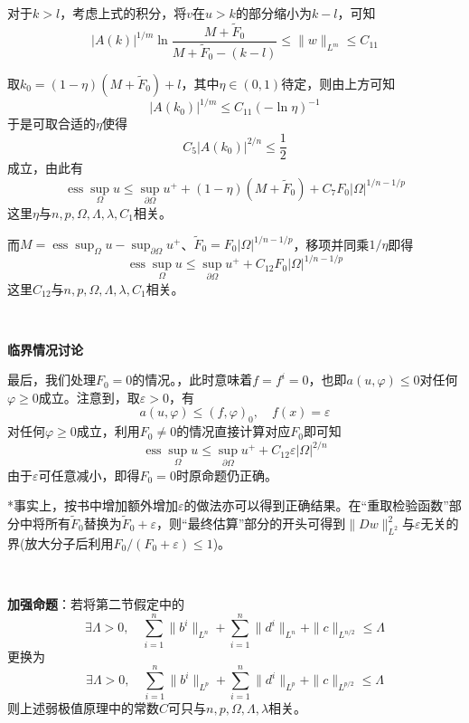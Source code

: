 \documentclass[a4paper,UTF8,fontset=windows,AutoFakeBold]{ctexart}
\DeclareMathOperator*{\ess}{ess}
\begin{document}
{    对于$k>l$，考虑上式的积分，将$v$在$u>k$的部分缩小为$k-l$，可知
    $$|A(k)|^{1/m}\ln\frac{M+\tilde{F}_0}{M+\tilde{F}_0-(k-l)}\le\|w\|_{L^m}\le C_{11}$$

    取$k_0=(1-\eta)(M+\tilde{F}_0)+l$，其中$\eta\in(0,1)$待定，则由上方可知
    $$|A(k_0)|^{1/m}\le C_{11}(-\ln\eta)^{-1}$$
    于是可取合适的$\eta$使得
    $$C_5|A(k_0)|^{2/n}\le\frac{1}{2}$$
    成立，由此有
    $$\ess\sup_\Omega u\le\sup_{\partial\Omega}u^++(1-\eta)(M+\tilde{F}_0)+C_7F_0|\Omega|^{1/n-1/p}$$
    这里$\eta$与$n,p,\Omega,\Lambda,\lambda,C_1$相关。

    而$M=\ess\sup_\Omega u-\sup_{\partial\Omega}u^+$、$\tilde{F}_0=F_0|\Omega|^{1/n-1/p}$，移项并同乘$1/\eta$即得
    $$\ess\sup_\Omega u\le\sup_{\partial\Omega}u^++C_{12}F_0|\Omega|^{1/n-1/p}$$
    这里$C_{12}$与$n,p,\Omega,\Lambda,\lambda,C_1$相关。

    \

    \textbf{临界情况讨论}

    最后，我们处理$F_0=0$的情况。，此时意味着$f=f^i=0$，也即$a(u,\varphi)\le0$对任何$\varphi\ge0$成立。注意到，取$\varepsilon>0$，有
    $$a(u,\varphi)\le(f,\varphi)_0,\quad f(x)=\varepsilon$$
    对任何$\varphi\ge0$成立，利用$F_0\ne0$的情况直接计算对应$F_0$即可知
    $$\ess\sup_\Omega u\le\sup_{\partial\Omega}u^++C_{12}\varepsilon|\Omega|^{2/n}$$
    由于$\varepsilon$可任意减小，即得$F_0=0$时原命题仍正确。
}

*事实上，按书中增加额外增加$\varepsilon$的做法亦可以得到正确结果。在``重取检验函数''部分中将所有$\tilde{F}_0$替换为$\tilde{F}_0+\varepsilon$，则``最终估算''部分的开头可得到$\|Dw\|_{L^2}^2$与$\varepsilon$无关的界(放大分子后利用$F_0/(F_0+\varepsilon)\le1$)。

\

\textbf{加强命题}：若将第二节假定中的
$$\exists\Lambda>0,\quad\sum_{i=1}^n\|b^i\|_{L^n}+\sum_{i=1}^n\|d^i\|_{L^n}+\|c\|_{L^{n/2}}\le\Lambda$$
更换为
$$\exists\Lambda>0,\quad\sum_{i=1}^n\|b^i\|_{L^p}+\sum_{i=1}^n\|d^i\|_{L^p}+\|c\|_{L^{p/2}}\le\Lambda$$
则上述弱极值原理中的常数$C$可只与$n,p,\Omega,\Lambda,\lambda$相关。
\end{document}
